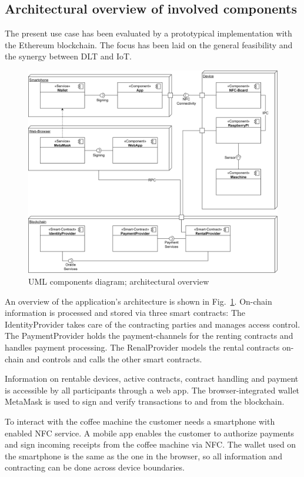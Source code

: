 \documentclass[conference]{IEEEtran}
\begin{document}
%
\subsection{Architectural overview of involved components}

The present use case has been evaluated by a prototypical implementation with the Ethereum blockchain. The focus has been laid on the general feasibility and the synergy between DLT and IoT. 

\begin{figure}[hbt]
\centering
\includegraphics[width=1.0\textwidth]{Architecture.png}
\caption{UML components diagram; architectural overview}
\label{fig:architecture}
\end{figure}

An overview of the application's architecture is shown in Fig.~\ref{fig:architecture}. On-chain information is processed and stored via three smart contracts: The IdentityProvider takes care of the contracting parties and manages access control. The PaymentProvider holds the payment-channels for the renting contracts and handles payment processing. The RenalProvider models the rental contracts on-chain and controls and calls the other smart contracts.

Information on rentable devices, active contracts, contract handling and payment is accessible by all participants through a web app. The browser-integrated wallet MetaMask is used to sign and verify transactions to and from the blockchain.

To interact with the coffee machine the customer needs a smartphone with enabled NFC service. A mobile app enables the customer to authorize payments and sign incoming receipts from the coffee machine via NFC. The wallet used on the smartphone is the same as the one in the browser, so all information and contracting can be done across device boundaries.
\end{document}

